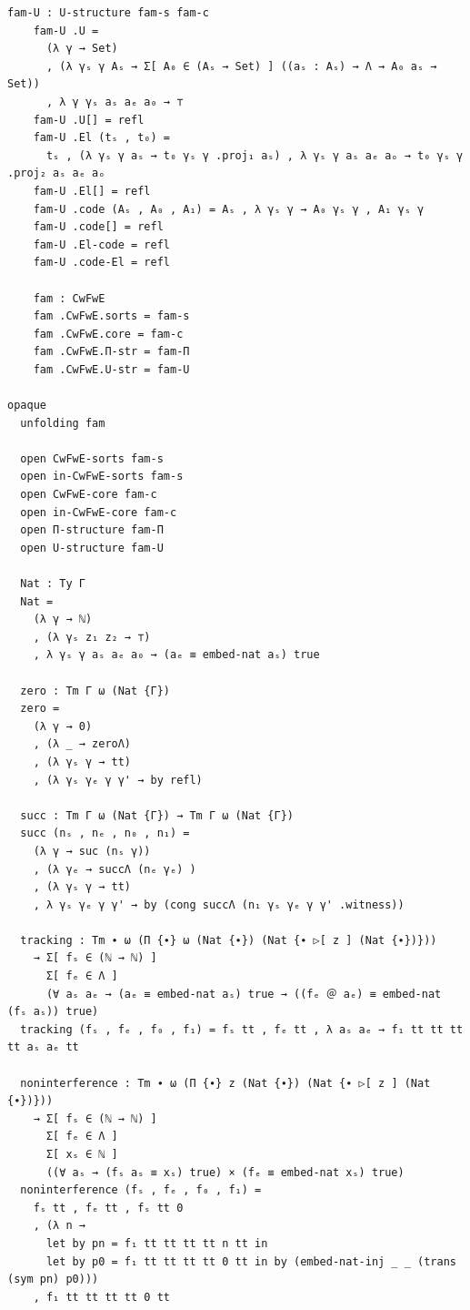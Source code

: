 {\begin{Verbatim}[breaklines=true,breakanywhere=true,fontsize=\scriptsize]
    fam-U : U-structure fam-s fam-c
    fam-U .U =
      (λ γ → Set)
      , (λ γₛ γ Aₛ → Σ[ A₀ ∈ (Aₛ → Set) ] ((aₛ : Aₛ) → Λ → A₀ aₛ → Set))
      , λ γ γₛ aₛ aₑ a₀ → ⊤
    fam-U .U[] = refl
    fam-U .El (tₛ , t₀) =
      tₛ , (λ γₛ γ aₛ → t₀ γₛ γ .proj₁ aₛ) , λ γₛ γ aₛ aₑ aₒ → t₀ γₛ γ .proj₂ aₛ aₑ aₒ
    fam-U .El[] = refl
    fam-U .code (Aₛ , A₀ , A₁) = Aₛ , λ γₛ γ → A₀ γₛ γ , A₁ γₛ γ
    fam-U .code[] = refl
    fam-U .El-code = refl
    fam-U .code-El = refl

    fam : CwFwE
    fam .CwFwE.sorts = fam-s
    fam .CwFwE.core = fam-c
    fam .CwFwE.Π-str = fam-Π
    fam .CwFwE.U-str = fam-U

opaque
  unfolding fam

  open CwFwE-sorts fam-s
  open in-CwFwE-sorts fam-s
  open CwFwE-core fam-c
  open in-CwFwE-core fam-c
  open Π-structure fam-Π
  open U-structure fam-U

  Nat : Ty Γ
  Nat =
    (λ γ → ℕ) 
    , (λ γₛ z₁ z₂ → ⊤)
    , λ γₛ γ aₛ aₑ a₀ → (aₑ ≡ embed-nat aₛ) true

  zero : Tm Γ ω (Nat {Γ})
  zero =
    (λ γ → 0)
    , (λ _ → zeroΛ)
    , (λ γₛ γ → tt)
    , (λ γₛ γₑ γ γ' → by refl)

  succ : Tm Γ ω (Nat {Γ}) → Tm Γ ω (Nat {Γ})
  succ (nₛ , nₑ , n₀ , n₁) =
    (λ γ → suc (nₛ γ))
    , (λ γₑ → succΛ (nₑ γₑ) )
    , (λ γₛ γ → tt)
    , λ γₛ γₑ γ γ' → by (cong succΛ (n₁ γₛ γₑ γ γ' .witness))

  tracking : Tm ∙ ω (Π {∙} ω (Nat {∙}) (Nat {∙ ▷[ z ] (Nat {∙})}))
    → Σ[ fₛ ∈ (ℕ → ℕ) ]
      Σ[ fₑ ∈ Λ ]
      (∀ aₛ aₑ → (aₑ ≡ embed-nat aₛ) true → ((fₑ ＠ aₑ) ≡ embed-nat (fₛ aₛ)) true)
  tracking (fₛ , fₑ , f₀ , f₁) = fₛ tt , fₑ tt , λ aₛ aₑ → f₁ tt tt tt tt aₛ aₑ tt

  noninterference : Tm ∙ ω (Π {∙} z (Nat {∙}) (Nat {∙ ▷[ z ] (Nat {∙})}))
    → Σ[ fₛ ∈ (ℕ → ℕ) ]
      Σ[ fₑ ∈ Λ ]
      Σ[ xₛ ∈ ℕ ]
      ((∀ aₛ → (fₛ aₛ ≡ xₛ) true) × (fₑ ≡ embed-nat xₛ) true)
  noninterference (fₛ , fₑ , f₀ , f₁) =
    fₛ tt , fₑ tt , fₛ tt 0
    , (λ n →
      let by pn = f₁ tt tt tt tt n tt in
      let by p0 = f₁ tt tt tt tt 0 tt in by (embed-nat-inj _ _ (trans (sym pn) p0)))
    , f₁ tt tt tt tt 0 tt


\end{Verbatim}
}
